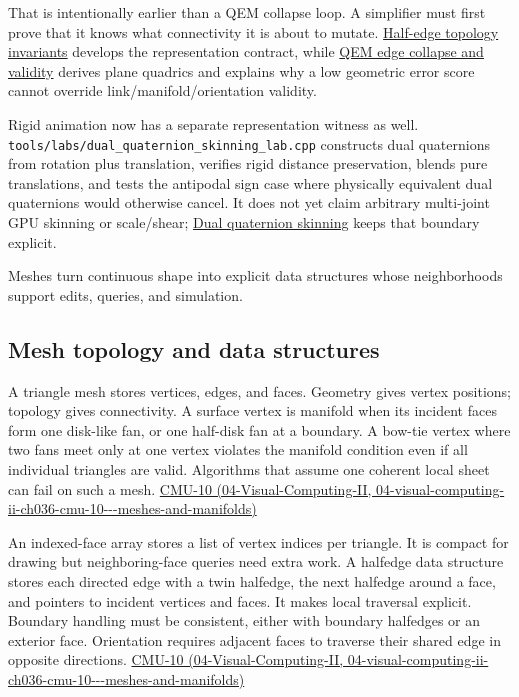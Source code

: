 That is intentionally earlier than a QEM collapse loop. A simplifier must first prove that it knows what connectivity it is about to mutate. \hyperref[appendix-faac749c9cdd]{Half-edge topology invariants} develops the representation contract, while \hyperref[appendix-89db9fe1bc8a]{QEM edge collapse and validity} derives plane quadrics and explains why a low geometric error score cannot override link/manifold/orientation validity.

Rigid animation now has a separate representation witness as well. \texttt{tools/labs/dual\_quaternion\_skinning\_lab.cpp} constructs dual quaternions from rotation plus translation, verifies rigid distance preservation, blends pure translations, and tests the antipodal sign case where physically equivalent dual quaternions would otherwise cancel. It does not yet claim arbitrary multi-joint GPU skinning or scale/shear; \hyperref[appendix-921f3f2efb53]{Dual quaternion skinning} keeps that boundary explicit.

Meshes turn continuous shape into explicit data structures whose neighborhoods support edits, queries, and simulation.

\subsection{Mesh topology and data structures}\label{03-visual-computing-i-ch002-mesh-topology-and-data-structures}

A triangle mesh stores vertices, edges, and faces. Geometry gives vertex positions; topology gives connectivity. A surface vertex is manifold when its incident faces form one disk-like fan, or one half-disk fan at a boundary. A bow-tie vertex where two fans meet only at one vertex violates the manifold condition even if all individual triangles are valid. Algorithms that assume one coherent local sheet can fail on such a mesh. \href{../04-Visual-Computing-II/main.pdf\#nameddest=04-visual-computing-ii-ch036-cmu-10---meshes-and-manifolds}{CMU-10 (04-Visual-Computing-II, 04-visual-computing-ii-ch036-cmu-10-\/-\/-meshes-and-manifolds)}

An indexed-face array stores a list of vertex indices per triangle. It is compact for drawing but neighboring-face queries need extra work. A halfedge data structure stores each directed edge with a twin halfedge, the next halfedge around a face, and pointers to incident vertices and faces. It makes local traversal explicit. Boundary handling must be consistent, either with boundary halfedges or an exterior face. Orientation requires adjacent faces to traverse their shared edge in opposite directions. \href{../04-Visual-Computing-II/main.pdf\#nameddest=04-visual-computing-ii-ch036-cmu-10---meshes-and-manifolds}{CMU-10 (04-Visual-Computing-II, 04-visual-computing-ii-ch036-cmu-10-\/-\/-meshes-and-manifolds)}

